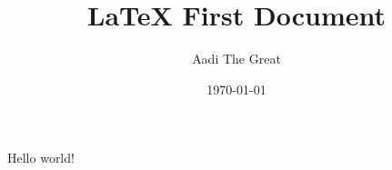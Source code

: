 \documentclass{article}
\title{LaTeX First Document}
\author{Aadi The Great}
\date{\today}
\begin{document}
Hello world!
\end{document}
